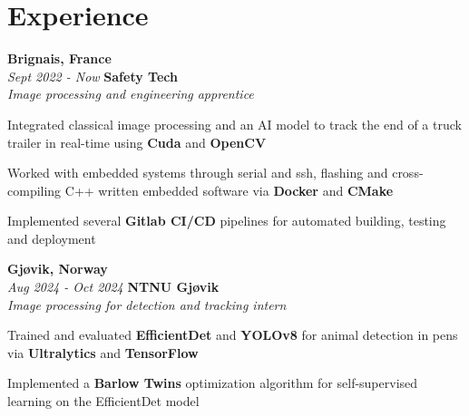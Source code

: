 
    \section{Experience}
        \begin{twocolentry}{
			\textbf{Brignais, France} \\
			\textit{Sept 2022 - Now}
            }{
            \textbf{Safety Tech} \\
            \textit{Image processing and engineering apprentice}
            }
        \end{twocolentry}

        \begin{onecolentry}
            \begin{highlights}
				\item Integrated classical image processing and an AI model to track the end of a truck trailer in real-time using \textbf{Cuda} and \textbf{OpenCV}
				\item Worked with embedded systems through serial and ssh, flashing and cross-compiling C++ written embedded software via \textbf{Docker} and \textbf{CMake}
                \item Implemented several \textbf{Gitlab CI/CD} pipelines for automated building, testing and deployment
            \end{highlights}
        \end{onecolentry}

        \begin{twocolentry}{
			\textbf{Gjøvik, Norway} \\
			\textit{Aug 2024 - Oct 2024}
            }{
			\textbf{NTNU Gjøvik} \\
			\textit{Image processing for detection and tracking intern}
            }
        \end{twocolentry}

        \begin{onecolentry}
            \begin{highlights}
                \item Trained and evaluated \textbf{EfficientDet} and \textbf{YOLOv8} for animal detection in pens via \textbf{Ultralytics} and \textbf{TensorFlow}
                \item Implemented a \textbf{Barlow Twins} optimization algorithm for self-supervised learning on the EfficientDet model
            \end{highlights}
        \end{onecolentry}

